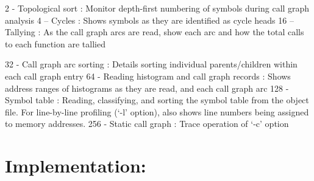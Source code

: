 \documentclass[a4paper,12pt]{article}
\begin{document}
\begin{itemize}
			2 - Topological sort :
			Monitor depth-first numbering of symbols during call graph analysis 
			4 – Cycles :
			Shows symbols as they are identified as cycle heads 
			16 – Tallying :
			As the call graph arcs are read, show each arc and how the total calls to each function are     	  		tallied 
			
			32 - Call graph arc sorting :
			Details sorting individual parents/children within each call graph entry 
			64 - Reading histogram and call graph records :
			Shows address ranges of histograms as they are read, and each call graph arc 
			128 - Symbol table :
			Reading, classifying, and sorting the symbol table from the object file. For line-by-line profiling (`-l' option), also shows line numbers being assigned to memory addresses. 
			256 - Static call graph :
			Trace operation of `-c' option 
			
		
		\end{itemize} 
		
		\newpage
		
\section{Implementation:}
    
\end{document}
